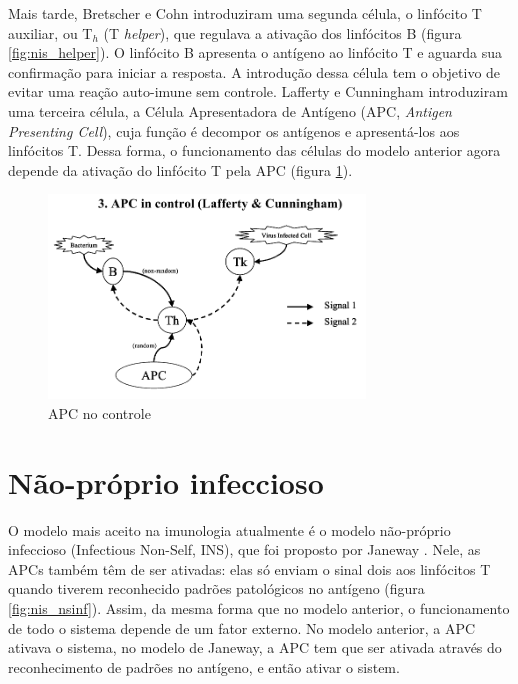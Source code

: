 Mais tarde, Bretscher e Cohn introduziram uma segunda célula, o linfócito T auxiliar, ou T$_{h}$ (T \emph{helper}), que regulava a ativação dos linfócitos B (figura \ref{fig:nis_helper}). O linfócito B apresenta o antígeno ao linfócito T e aguarda sua confirmação para iniciar a resposta. A introdução dessa célula tem o objetivo de evitar uma reação auto-imune sem controle. Lafferty e Cunningham introduziram uma terceira célula, a Célula Apresentadora de Antígeno (APC, \emph{Antigen Presenting Cell}), cuja função é decompor os antígenos e apresentá-los aos linfócitos T. Dessa forma, o funcionamento das células do modelo anterior agora depende da ativação do linfócito T pela APC (figura \ref{fig:nis_apc}).

\begin{figure}[h!]
\centering
\includegraphics[width=0.75\textwidth]{img/signals3-apc.png}
\caption{APC no controle \cite{Aickelin2002}}
\label{fig:nis_apc}
\end{figure}

\section{Não-próprio infeccioso}

O modelo mais aceito na imunologia atualmente é o modelo não-próprio infeccioso (Infectious Non-Self, INS), que foi proposto por Janeway \cite{Janeway1989}. Nele, as APCs também têm de ser ativadas: elas só enviam o sinal dois aos linfócitos T quando tiverem reconhecido padrões patológicos no antígeno (figura \ref{fig:nis_nsinf}). Assim, da mesma forma que no modelo anterior, o funcionamento de todo o sistema depende de um fator externo. No modelo anterior, a APC ativava o sistema, no modelo de Janeway, a APC tem que ser ativada através do reconhecimento de padrões no antígeno, e então ativar o sistem.

